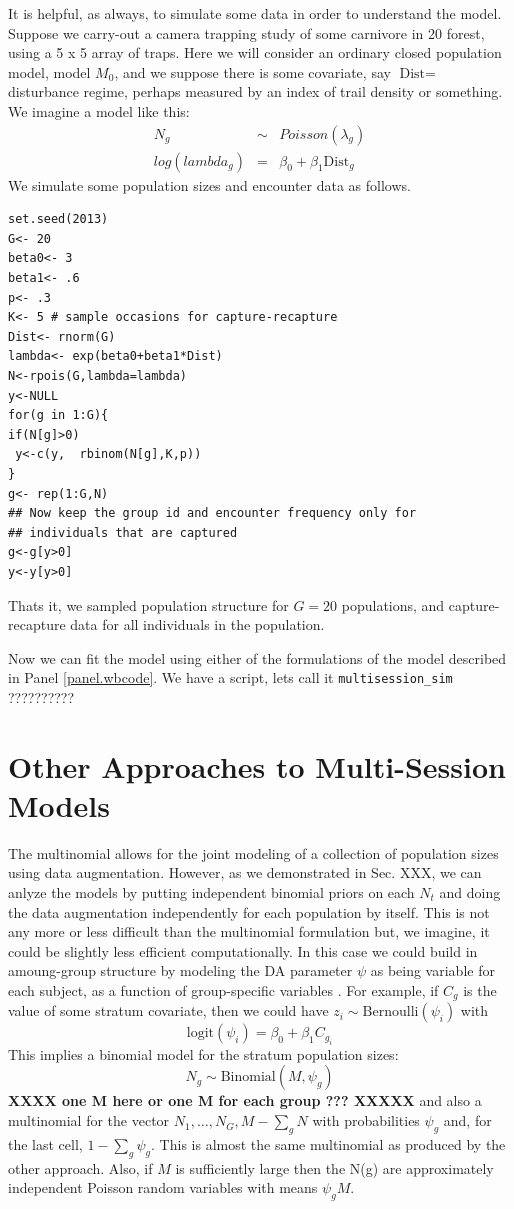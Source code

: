 It is helpful, as always, to simulate some data in order to understand
the model. Suppose we carry-out a camera trapping study of some
carnivore in 20 forest, using a 5 x 5 array of traps. Here we will
consider an ordinary closed population model, model $M_0$, and we
suppose there is 
some covariate, say $\mbox{Dist} = $ disturbance regime, perhaps measured by an
index of trail density or something.
We imagine a model like this:
\begin{eqnarray*}
N_{g} &\sim& Poisson(\lambda_{g})  \\
log(lambda_{g})& = &\beta_{0} + \beta_{1} \mbox{Dist}_{g} 
\end{eqnarray*}
We simulate some population sizes and encounter data  as
follows.
\begin{verbatim}
set.seed(2013)
G<- 20
beta0<- 3
beta1<- .6
p<- .3
K<- 5 # sample occasions for capture-recapture
Dist<- rnorm(G)
lambda<- exp(beta0+beta1*Dist)
N<-rpois(G,lambda=lambda)
y<-NULL
for(g in 1:G){
if(N[g]>0)
 y<-c(y,  rbinom(N[g],K,p))
}
g<- rep(1:G,N)
## Now keep the group id and encounter frequency only for
## individuals that are captured 
g<-g[y>0]
y<-y[y>0]
\end{verbatim}
Thats it, we sampled population structure for $G=20$ populations, and
capture-recapture data for all individuals in the population. 

Now we can fit the model using either of the formulations 
of the model described in Panel \ref{panel.wbcode}.  We have a script,
lets call it \mbox{\tt multisession\_sim}
??????????



\section{Other Approaches to Multi-Session Models}


The multinomial allows for the joint modeling of a collection of
population sizes using data augmentation.  However, as we 
demonstrated in Sec. XXX, we can anlyze the models by putting
independent binomial priors on each $N_{t}$ and doing the data
augmentation independently for each population by itself. 
This is not any more or less difficult than the multinomial
formulation but, we imagine, it could be slightly less efficient computationally.
In this case we could build in amoung-group structure by modeling 
the DA parameter $\psi$ as being
variable for each subject,  as a function of group-specific variables
\citep[see][for an example]{hendriks_etal:2013}.
For example, if $C_{g}$ is the value of some stratum
covariate, then we could have $z_{i} \sim \mbox{Bernoulli}( \psi_{i})$
with
\[
 \mbox{logit}(\psi_{i}) = \beta_0 + \beta_1  C_{g_{i}}
\]
This implies a binomial model for the stratum population sizes:
\[
N_{g} \sim \mbox{Binomial}(M, \psi_{g})
\]  {\bf XXXX one M here or one M for each group ??? XXXXX}
and also a multinomial for the vector 
$N_{1}, \ldots, N_{G}, M-\sum_{g} N$ with probabilities
$\psi_{g}$ and, for the last cell, $1-\sum_{g} \psi_{g}$. This is
almost the same multinomial as produced by the other approach.
Also, if $M$ is sufficiently large then the N(g) are approximately
independent Poisson random variables with means $\psi_{g} M$.

